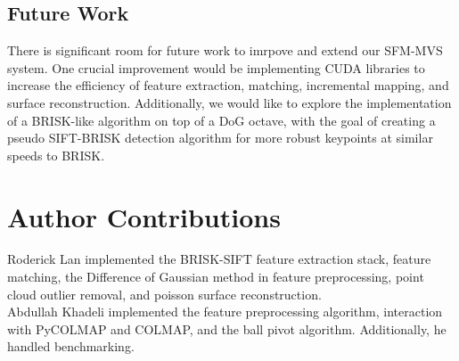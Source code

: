 \documentclass[conference,compsoc]{IEEEtran}
\begin{document}
\subsection{Future Work}
There is significant room for future work to imrpove and extend our SFM-MVS system. One crucial 
improvement would be implementing CUDA libraries to increase the efficiency
of feature extraction, matching, incremental mapping, and surface reconstruction. 
Additionally, we would like to explore the implementation of a BRISK-like algorithm
on top of a DoG octave, with the goal of creating a pseudo SIFT-BRISK detection 
algorithm for more robust keypoints at similar speeds to BRISK. 














\section*{Author Contributions}
Roderick Lan implemented the BRISK-SIFT feature extraction stack, feature matching,
the Difference of Gaussian method in feature preprocessing, point cloud outlier removal, 
and poisson surface reconstruction.
\\
Abdullah Khadeli implemented the feature preprocessing algorithm, interaction with
PyCOLMAP and COLMAP, and the ball pivot algorithm. Additionally, he handled 
benchmarking. 
\end{document}
